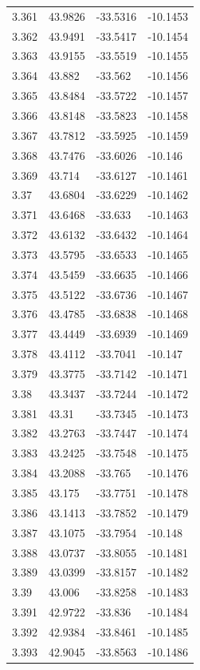 \begin{tabular}{llll}
3.361 & 43.9826 & -33.5316 & -10.1453 \\
3.362 & 43.9491 & -33.5417 & -10.1454 \\
3.363 & 43.9155 & -33.5519 & -10.1455 \\
3.364 & 43.882 & -33.562 & -10.1456 \\
3.365 & 43.8484 & -33.5722 & -10.1457 \\
3.366 & 43.8148 & -33.5823 & -10.1458 \\
3.367 & 43.7812 & -33.5925 & -10.1459 \\
3.368 & 43.7476 & -33.6026 & -10.146 \\
3.369 & 43.714 & -33.6127 & -10.1461 \\
3.37 & 43.6804 & -33.6229 & -10.1462 \\
3.371 & 43.6468 & -33.633 & -10.1463 \\
3.372 & 43.6132 & -33.6432 & -10.1464 \\
3.373 & 43.5795 & -33.6533 & -10.1465 \\
3.374 & 43.5459 & -33.6635 & -10.1466 \\
3.375 & 43.5122 & -33.6736 & -10.1467 \\
3.376 & 43.4785 & -33.6838 & -10.1468 \\
3.377 & 43.4449 & -33.6939 & -10.1469 \\
3.378 & 43.4112 & -33.7041 & -10.147 \\
3.379 & 43.3775 & -33.7142 & -10.1471 \\
3.38 & 43.3437 & -33.7244 & -10.1472 \\
3.381 & 43.31 & -33.7345 & -10.1473 \\
3.382 & 43.2763 & -33.7447 & -10.1474 \\
3.383 & 43.2425 & -33.7548 & -10.1475 \\
3.384 & 43.2088 & -33.765 & -10.1476 \\
3.385 & 43.175 & -33.7751 & -10.1478 \\
3.386 & 43.1413 & -33.7852 & -10.1479 \\
3.387 & 43.1075 & -33.7954 & -10.148 \\
3.388 & 43.0737 & -33.8055 & -10.1481 \\
3.389 & 43.0399 & -33.8157 & -10.1482 \\
3.39 & 43.006 & -33.8258 & -10.1483 \\
3.391 & 42.9722 & -33.836 & -10.1484 \\
3.392 & 42.9384 & -33.8461 & -10.1485 \\
3.393 & 42.9045 & -33.8563 & -10.1486 \\

\end{tabular}
